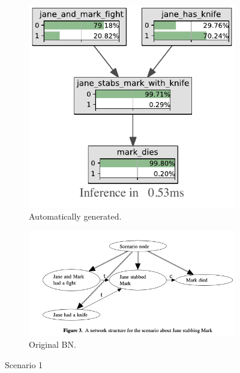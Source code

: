 \begin{figure}[htbp]
\begin{subfigure}{.4\textwidth}
\includegraphics[width=\linewidth]{../experiments/VlekNetwork/bnImage/BNIMAGEKB1.pdf}
\caption{Automatically generated.}
\label{kb1}
\end{subfigure}
\begin{subfigure}{.6\textwidth}
\includegraphics[width=\linewidth]{images/vlek2015a.png}
\caption{Original BN.}
\label{vlek1}
\end{subfigure}
\caption{Scenario 1}
\end{figure}


